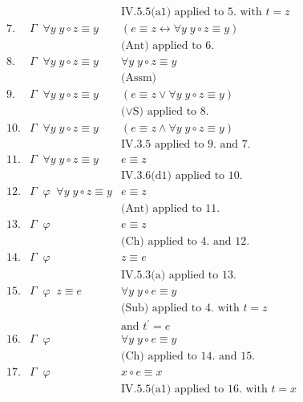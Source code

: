 \begin{enumerate}[1.]
\begin{enumerate}[(i)]
\begin{enumerate}
\[\begin{array}{lll}
\  & \                   & \mbox{IV.5.5(a1) applied to 5. with $t = z$} \\
7. & \Gamma \;\; \forall y \; y \circ z \equiv y & (e \equiv z \leftrightarrow \forall y \; y \circ z \equiv y) \\
\  & \                   & \mbox{(Ant) applied to 6.} \\
8. & \Gamma \;\; \forall y \; y \circ z \equiv y & \forall y \; y \circ z \equiv y \\
\  & \                   & \mbox{(Assm)} \\
9. & \Gamma \;\; \forall y \; y \circ z \equiv y & (e \equiv z \lor \forall y \; y \circ z \equiv y) \\
\  & \                   & \mbox{($\lor$S) applied to 8.} \\
10.& \Gamma \;\; \forall y \; y \circ z \equiv y & (e \equiv z \land \forall y \; y \circ z \equiv y) \\
\  & \                   & \mbox{IV.3.5 applied to 9. and 7.} \\
11.& \Gamma \;\; \forall y \; y \circ z \equiv y & e \equiv z \\
\  & \                   & \mbox{IV.3.6(d1) applied to 10.} \\
12.& \Gamma \;\; \varphi \;\; \forall y \; y \circ z \equiv y & e \equiv z \\
\  & \                   & \mbox{(Ant) applied to 11.} \\
13.& \Gamma \;\; \varphi & e \equiv z \\
\  & \                   & \mbox{(Ch) applied to 4. and 12.} \\
14.& \Gamma \;\; \varphi & z \equiv e \\
\  & \                   & \mbox{IV.5.3(a) applied to 13.} \\
15.& \Gamma \;\; \varphi \;\; z \equiv e & \forall y \; y \circ e \equiv y \\
\  & \                   & \mbox{(Sub) applied to 4. with $t = z$} \\
\  & \                   & \mbox{and $t^\prime = e$} \\
16.& \Gamma \;\; \varphi & \forall y \; y \circ e \equiv y \\
\  & \                   & \mbox{(Ch) applied to 14. and 15.} \\
17.& \Gamma \;\; \varphi & x \circ e \equiv x \\
\  & \                   & \mbox{IV.5.5(a1) applied to 16. with $t = x$} \\

\end{array}\]
\end{enumerate}
\end{enumerate}
\end{enumerate}
